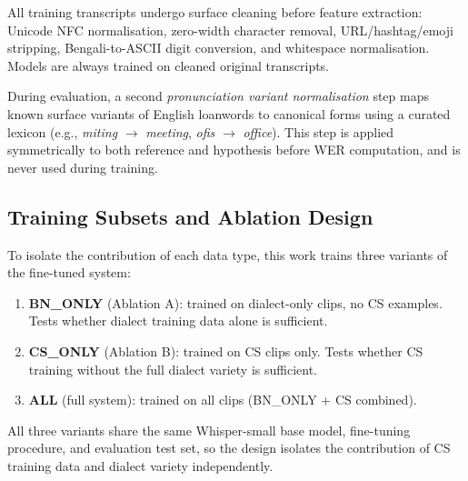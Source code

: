 All training transcripts undergo surface cleaning before feature extraction:
Unicode NFC normalisation, zero-width character removal, URL/hashtag/emoji
stripping, Bengali-to-ASCII digit conversion, and whitespace normalisation.
Models are always trained on cleaned original transcripts.

During evaluation, a second \emph{pronunciation variant normalisation} step
maps known surface variants of English loanwords to canonical forms using a
curated lexicon (e.g., \textit{miting} $\to$ \textit{meeting},
\textit{ofis} $\to$ \textit{office}).
This step is applied symmetrically to both reference and hypothesis before
WER computation, and is never used during training.

\subsection{Training Subsets and Ablation Design}

To isolate the contribution of each data type, this work trains three variants
of the fine-tuned system:

\begin{enumerate}[leftmargin=2em, itemsep=2pt]
  \item \textbf{BN\_ONLY} (Ablation A): trained on dialect-only clips,
        no CS examples. Tests whether dialect training data alone is sufficient.
  \item \textbf{CS\_ONLY} (Ablation B): trained on CS clips only.
        Tests whether CS training without the full dialect variety is sufficient.
  \item \textbf{ALL} (full system): trained on all clips (BN\_ONLY + CS
        combined).
\end{enumerate}

All three variants share the same Whisper-small base model, fine-tuning
procedure, and evaluation test set, so the design isolates the contribution of
CS training data and dialect variety independently.
